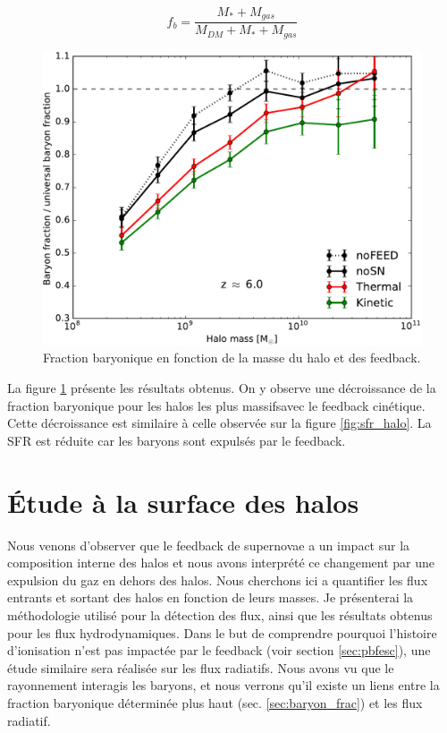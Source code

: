 \begin{equation}
f_b = \frac{M_* + M_{gas} }{M_{DM} + M_* + M_{gas} }
\end{equation}

\begin{figure}
		\includegraphics[width=.95\linewidth]{img/03/baryon_frac.pdf}
        \caption[Fraction baryonique]{Fraction baryonique en fonction de la masse du halo et des feedback.
 		\label{fig:bfrac}}
\end{figure}

La figure \ref{fig:bfrac} présente les résultats obtenus.
On y observe une décroissance de la fraction baryonique pour les halos les plus massifsavec le feedback cinétique.
Cette décroissance est similaire à celle observée sur la figure \ref{fig:sfr_halo}.
La \ac{SFR} est réduite car les baryons sont expulsés par le feedback.


\clearpage
\section{Étude à la surface des halos}

Nous venons d'observer que le feedback de supernovae a un impact sur la composition interne des halos et nous avons interprété ce changement par une expulsion du gaz en dehors des halos.
Nous cherchons ici a quantifier les flux entrants et sortant des halos en fonction de leurs masses.
Je présenterai la méthodologie utilisé pour la détection des flux, ainsi que les résultats obtenus pour les flux hydrodynamiques.
Dans le but de comprendre pourquoi l'histoire d'ionisation n'est pas impactée par le feedback (voir section \ref{sec:pbfesc}), une étude similaire sera réalisée sur les flux radiatifs.
Nous avons vu que le rayonnement interagis les baryons, et nous verrons qu'il existe un liens entre la fraction baryonique déterminée plus haut (sec. \ref{sec:baryon_frac}) et les flux radiatif.


